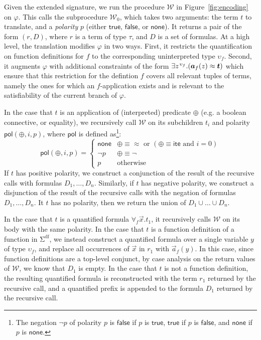 \documentclass[runningheads,a4paper]{llncs}
\newcommand{\con}[1]{\mathsf{#1}}
\let\oldSigma=\Sigma
\def\Sigma{\mathrm{\oldSigma}}
\newcommand{\teq}{\approx}
\newcommand{\conv}{\mathcal{W}}
\newcommand{\sfundefs}[1]{#1^\mathrm{df}}
\newcommand{\pnone}{\con{none}}
\newcommand{\ptrue}{\con{true}}
\newcommand{\pfalse}{\con{false}}
\newcommand{\pol}{\con{pol}}
\newcommand{\lite}{\con{ite}}
\newcommand{\boolop}{\oplus}
\newcommand{\forallf}[1]{\forall_{#1}}
\newcommand{\vecfarg}[1]{\vec{a}_{#1}}
\newcommand{\fargsort}[1]{\upsilon_{#1}}
\newcommand{\vthinspace}{\kern+0.083333em}
\newcommand{\typ}[1]{^{\vthinspace #1}}
\begin{document}
Given the extended signature, we run the procedure $\conv$ in Figure~\ref{fig:encoding} on $\varphi$.
This calls the subprocedure $\conv_0$, which takes two arguments: the term $t$ to translate, and a \emph{polarity} $p$ (either $\ptrue$, $\pfalse$, or $\pnone$).
It returns a pair of the form $( r, D )$, where $r$ is a term of type $\tau$, and $D$ is a set of formulas.
At a high level, the translation modifies $\varphi$ in two ways.
First, it restricts the quantification on function definitions for $f$ to the corresponding uninterpreted type $\fargsort{f}$.
Second, it augments $\varphi$ with additional constraints of the form $\exists z\typ{\fargsort{f}}. ( \vecfarg{f}( z ) \teq \vec t )$
which ensure that this restriction for the defintion $f$ covers all relevant tuples of terms,
namely the ones for which an $f$-application exists and is relevant to the satisfiability of the current branch of $\varphi$.

In the case that $t$ is an application of (interpreted) predicate $\boolop$ (e.g. a boolean connective, or equality),
we recursively call $\conv$ on its subchildren $t_i$ and polarity $\pol( \boolop, i, p )$, where $\pol$ is defined as\footnote{The negation $\neg p$ of polarity $p$ is 
$\pfalse$ if $p$ is $\ptrue$,
$\ptrue$ if $p$ is $\pfalse$, and
$\pnone$ if $p$ is $\pnone$.}:
\begin{equation*}
\pol( \boolop, i, p ) = \begin{cases}
                         \pnone & \boolop \equiv \teq \text{ or } ( \boolop \equiv \lite \text{ and } i=0 ) \\
                         \neg p & \boolop \equiv \neg \\
                         p & \text{otherwise}
                         \end{cases}
\end{equation*}
If $t$ has positive polarity,
we construct a conjunction of the result of the recursive calls with formulas $D_1, \ldots, D_n$.
Similarly, if $t$ has negative polarity,
we construct a disjunction of the result of the recursive calls with the negation of formulas $D_1, \ldots, D_n$.
It $t$ has no polarity,
then we return the union of $D_1 \cup \ldots \cup D_n$.

In the case that $t$ is a quantified formula $\forallf{f} \vec x. t_1$, it recursively calls $\conv$ on its body with the same polarity.
In the case that $t$ is a function definition of a function in $\sfundefs{\Sigma}$,
we instead construct a quantified formula over a single variable $y$ of type $\fargsort{f}$,
and replace all occurrences of $\vec x$ in $r_1$ with $\vecfarg{f}( y )$.
In this case, since function definitions are a top-level conjunct, by case analysis on the return values of $\conv$, we know that $D_1$ is empty.
In the case that $t$ is not a function definition, 
the resulting quantified formula is reconstructed with the term $r_1$ returned by the recursive call,
and a quantified prefix is appended to the formula $D_1$ returned by the recursive call.
\end{document}
